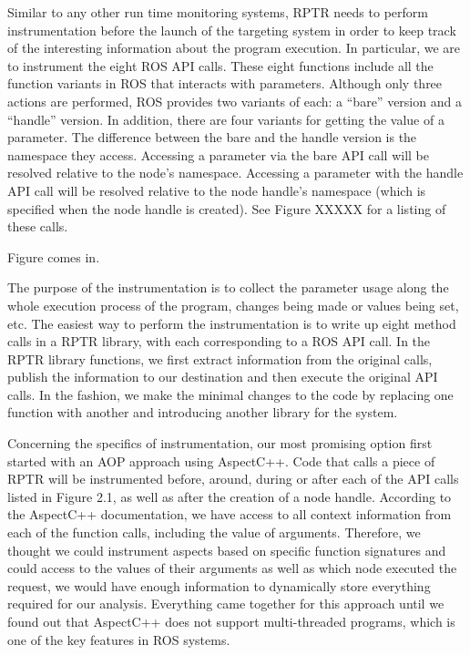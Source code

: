 Similar to any other run time monitoring systems, RPTR needs to perform instrumentation before the launch of the targeting system in order to keep track of the interesting information about the program execution. In particular, we are to instrument the eight ROS API calls. These eight functions include all the function variants in ROS that interacts with parameters. Although only three actions are performed, ROS provides two variants of each: a “bare” version and a “handle” version. In addition, there are four variants for getting the value of a parameter. The difference between the bare and the handle version is the namespace they access. Accessing a parameter via the bare API call will be resolved relative to the node’s namespace. Accessing a parameter with the handle API call will be resolved relative to the node handle’s namespace (which is specified when the node handle is created). See Figure XXXXX for a listing of these calls. 

Figure comes in. 

The purpose of the instrumentation is to collect the parameter usage along the whole execution process of the program, changes being made or values being set, etc. The easiest way to perform the instrumentation is to write up eight method calls in a RPTR library, with each corresponding to a ROS API call. In the RPTR library functions, we first extract information from the original calls, publish the information to our destination and then execute the original API calls. In the fashion, we make the minimal changes to the code by replacing one function with another and introducing another library for the system. 

Concerning the specifics of instrumentation, our most promising option first started with an AOP approach using AspectC++. Code that calls a piece of RPTR will be instrumented before, around, during or after each of the API calls listed in Figure 2.1, as well as after the creation of a node handle. According to the AspectC++ documentation, we have access to all context information from each of the function calls, including the value of arguments. Therefore, we thought we could instrument aspects based on specific function signatures and could access to the values of their arguments as well as which node executed the request, we would have enough information to dynamically store everything required for our analysis.  Everything came together for this approach until we found out that AspectC++ does not support multi-threaded programs, which is one of the key features in ROS systems.

